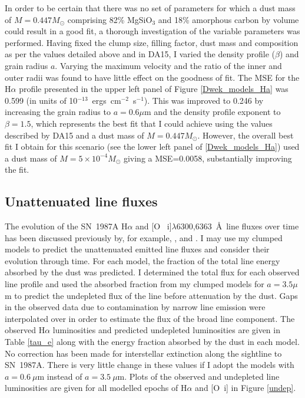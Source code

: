 In order to be certain that there was no set of parameters for which a dust mass of $M=0.447M_{\odot}$ comprising 82\% MgSiO$_3$ and 18\% amorphous carbon by volume could result in a good fit, a thorough investigation of the variable parameters was performed.  Having fixed the clump size, filling factor, dust mass and composition as per the values detailed above and in DA15, I varied the density profile ($\beta$) and grain radius $a$.  Varying the maximum velocity and the ratio of the inner and outer radii was found to have little effect on the goodness of fit.  The MSE for the H$\alpha$ profile presented in the upper left panel of Figure \ref{Dwek_models_Ha} was 0.599 (in units of 10$^{-13}$~ergs~cm$^{-2}$~s$^{-1}$).  This was improved to 0.246 by increasing the grain radius to $a=0.6\mu$m and the density profile exponent to $\beta=1.5$, which represents the best fit that I could achieve using the values described by DA15 and a dust mass of $M=0.447M_{\odot}$.  However, the overall best fit I obtain for this scenario (see the lower left panel of \ref{Dwek_models_Ha}) used a dust mass of $M=5 \times 10^{-4}M_{\odot}$ giving a MSE=0.0058, substantially improving the fit.

\subsection{Unattenuated line fluxes}

The evolution of the SN~1987A H$\alpha$ and [O~{\sc 
i}]$\lambda$6300,6363~\AA\ line fluxes over time has been discussed 
previously by, for example, \citet{Li1992}, \citet{Xu1992} and 
\citet{Kozma1998b}. I may use my clumped models to predict the 
unattenuated 
emitted line fluxes and consider their evolution through time.  For each 
model, the fraction of the total line energy absorbed by the dust was 
predicted.  I determined the total flux for each observed line profile 
and used the absorbed fraction from my clumped models for $a=3.5\mu$m to 
predict the undepleted flux of the line before attenuation by the dust.  
Gaps in the observed data due to contamination by narrow line emission 
were interpolated over in order to estimate the flux of the broad line 
component. The observed H$\alpha$ luminosities and predicted undepleted 
luminosities are given in Table \ref{tau_e} along with the energy fraction 
absorbed by the dust in each model. No correction has been made for 
interstellar extinction along the sightline to SN~1987A.
There is very little change in 
these values if I adopt the models with $a=0.6~\mu$m instead of 
$a=3.5~\mu$m.  Plots of the observed and undepleted line luminosities are 
given for all modelled epochs of H$\alpha$ and [O~{\sc i}] in Figure 
\ref{undep}.

